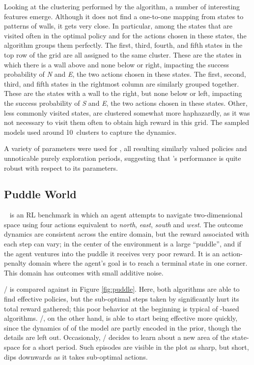 Looking at the clustering performed by the algorithm, a number of
interesting features emerge.  Although it does not find a one-to-one
mapping from states to patterns of walls, it gets very close.  In
particular, among the states that are visited often in the optimal
policy and for the actions chosen in these states, the algorithm
groups them perfectly.  The first, third, fourth, and fifth states in
the top row of the grid are all assigned to the same cluster.  These
are the states in which there is a wall above and none below or right,
impacting the success probability of \emph{N} and \emph{E}, the two actions
chosen in these states.  The first, second, third, and fifth states in
the rightmost column are similarly grouped together.  These are the
states with a wall to the right, but none below or left, impacting the
success probability of \emph{S} and \emph{E}, the two actions chosen in these
states.  Other, less commonly visited states, are clustered somewhat
more haphazardly,
as it was not necessary to visit them often to
obtain high reward in this grid.  The sampled models used around
10~clusters to capture the dynamics.

A variety of parameters were used for , all resulting similarly valued policies and unnoticable purely exploration periods, suggesting that 's performance is quite robust with respect to its parameters.

\subsection{Puddle World}
\label{puddle}

~\cite{boyan94b} is an RL benchmark in which an agent attempts to navigate two-dimensional space using four actions equivalent to \emph{north}, \emph{east}, \emph{south} and \emph{west}. The outcome dynamics are consistent across the entire domain, but the reward associated with each step can vary; in the center of the environment is a large ``puddle'', and if the agent ventures into the puddle it receives very poor reward. It is an action-penalty domain where the agent's goal is to reach a terminal state in one corner. This domain has outcomes with small additive noise.

/ is compared against  in Figure \ref{fig:puddle}. Here, both algorithms are able to find effective policies, but the sub-optimal steps taken by  significantly hurt its total reward gathered; this poor behavior at the beginning is typical of -based algorithms. /, on the other hand, is able to start being effective more quickly, since the dynamics of of the model are partly encoded in the prior, though the details are left out. Occasionaly, / decides to learn about a new area of the state-space for a short period. Such episodes are visible in the plot as sharp, but short, dips downwards as it takes sub-optimal actions.

